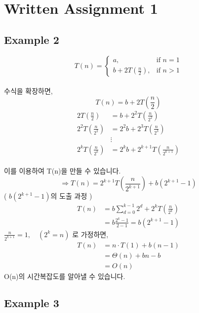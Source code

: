 \documentclass{article}
\begin{document}
\section*{Written Assignment 1 }
\vspace{10mm} 

\subsection*{Example 2}
\[
T(n) =
\begin{cases} %
a, & \text{if } n = 1 \\ %
b + 2T\left(\frac{n}{2}\right), & \text{if } n > 1
\end{cases}
\]
\\
수식을 확장하면,
\[
T(n) = b + 2T\left(\frac{n}{2}\right)
\]
\[
\begin{aligned}
2T\left(\frac{n}{2}\right) &= b + 2^2T\left(\frac{n}{2^2}\right) \\
2^2T\left(\frac{n}{2^2}\right) &= 2^2b + 2^3T\left(\frac{n}{2^3}\right) \\
& \vdots \\
2^kT\left(\frac{n}{2^k}\right) &= 2^kb + 2^{k+1}T\left(\frac{n}{2^{k+1}}\right)
\end{aligned}
\]
\\
이를 이용하여 T(n)을 만들 수 있습니다.
\[
\Rightarrow T(n) = 2^{k+1}T\left(\frac{n}{2^{k+1}}\right) + b(2^{k+1} - 1)
\]
( $b(2^{k+1} - 1)$의 도출 과정 )
\[
\begin{aligned}
T(n) &= b \sum_{d=0}^{k-1} 2^d + 2^kT\left(\frac{n}{2^k}\right) \\
&= b \frac{2^k-1}{2-1} = b(2^{k+1}-1)
\end{aligned}
\]
$\frac{n}{2^{k+1}}= 1, \quad (2^k = n)$ 로 가정하면,
\[
\begin{aligned}
T(n) &= n \cdot T(1) + b (n - 1) \\
&= \Theta(n) + bn - b \\
&= O(n)
\end{aligned}
\]
O(n)의 시간복잡도를 알아낼 수 있습니다.


\vspace{10mm} %

\subsection*{Example 3}
\end{document}
